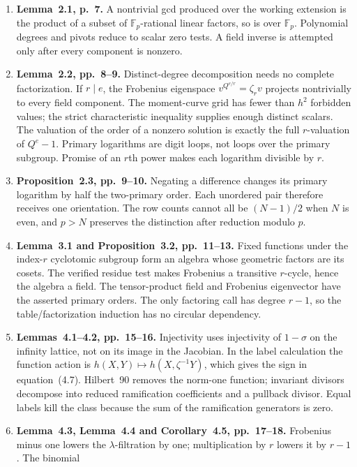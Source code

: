 \begin{enumerate}
\item \textbf{Lemma~2.1, p.~7.} A nontrivial gcd produced over the
working extension is the product of a subset of $\mathbb F_p$-rational
linear factors, so is over $\mathbb F_p$. Polynomial degrees and
pivots reduce to scalar zero tests. A field inverse is attempted only
after every component is nonzero.
\item \textbf{Lemma~2.2, pp.~8--9.} Distinct-degree decomposition
needs no complete factorization. If $r\mid e$, the Frobenius
eigenspace $v^{Q^{e/r}}=\zeta_rv$ projects nontrivially to every
field component. The moment-curve grid has fewer than $h^2$ forbidden
values; the strict characteristic inequality supplies enough distinct
scalars. The valuation of the order of a nonzero solution is exactly
the full $r$-valuation of $Q^e-1$. Primary logarithms are digit loops,
not loops over the primary subgroup. Promise of an $r$th power makes
each logarithm divisible by $r$.
\item \textbf{Proposition~2.3, pp.~9--10.} Negating a difference
changes its primary logarithm by half the two-primary order. Each
unordered pair therefore receives one orientation. The row counts
cannot all be $(N-1)/2$ when $N$ is even, and $p>N$ preserves the
distinction after reduction modulo $p$.
\item \textbf{Lemma~3.1 and Proposition~3.2, pp.~11--13.} Fixed
functions under the index-$r$ cyclotomic subgroup form an algebra
whose geometric factors are its cosets. The verified residue test
makes Frobenius a transitive $r$-cycle, hence the algebra a field.
The tensor-product field and Frobenius eigenvector have the asserted
primary orders. The only factoring call has degree $r-1$, so the
table/factorization induction has no circular dependency.
\item \textbf{Lemmas~4.1--4.2, pp.~15--16.} Injectivity uses
injectivity of $1-\sigma$ on the infinity lattice, not on its image
in the Jacobian. In the label calculation the function action is
$h(X,Y)\mapsto h(X,\zeta^{-1}Y)$, which gives the sign in
equation~(4.7). Hilbert~90 removes the norm-one function; invariant
divisors decompose into reduced ramification coefficients and a
pullback divisor. Equal labels kill the class because the sum of
the ramification generators is zero.
\item \textbf{Lemma~4.3, Lemma~4.4 and Corollary~4.5,
pp.~17--18.} Frobenius minus one lowers the $\lambda$-filtration
by one; multiplication by $r$ lowers it by $r-1$. The binomial

\end{enumerate}
